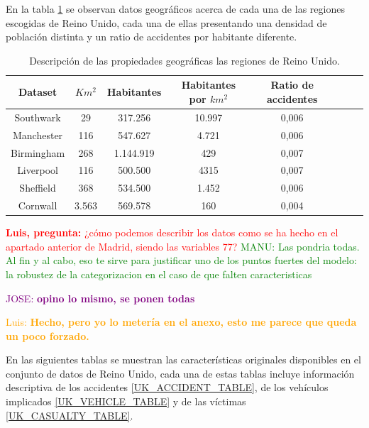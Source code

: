 \documentclass{uathesis-es}
\begin{document}
{%

En la tabla \ref{UK_statistics} se observan datos geográficos acerca de cada una de las regiones escogidas de Reino Unido, cada una de ellas presentando una densidad de población distinta y un ratio de accidentes por habitante diferente.

\begin{table}[H]
	\begin{center}
		\begin{tabular}{|c|c||c|c|c|c|c|c|}
		\hline
        \textbf{Dataset} & \textbf{$Km^2$} & \textbf{Habitantes} & \textbf{Habitantes por $km^2$} & \textbf{Ratio de accidentes}
		\\ \hline \hline
        Southwark   &  29   &   317.256  & 10.997  & 0,006 \\ \hline
        Manchester  &  116  &   547.627  &  4.721  & 0,006 \\ \hline
        Birmingham  &  268  & 1.144.919  &    429  & 0,007 \\ \hline
        Liverpool   &  116  &   500.500  &   4315  & 0,007 \\ \hline
        Sheffield   &  368  &   534.500  &  1.452  & 0,006  \\ \hline
        Cornwall    & 3.563 &   569.578  &    160  & 0,004 \\ \hline
		\end{tabular}
	\end{center}
	\caption{Descripción de las propiedades geográficas las regiones de Reino Unido.}
	\label{UK_statistics}
\end{table}


\textcolor{red}{\textbf{Luis, pregunta:} ¿cómo podemos describir los datos como se ha hecho en el apartado anterior de Madrid, siendo las variables 77?}
\textcolor{green}{MANU: Las pondria todas. Al fin y al cabo, eso te sirve para justificar uno de los puntos fuertes del modelo: la robustez de la categorizacion en el caso de que falten caracteristicas}

\textcolor{purple}{JOSE: \textbf{opino lo mismo, se ponen todas}}

\textcolor{orange}{Luis: \textbf{Hecho, pero yo lo metería en el anexo, esto me parece que queda un poco forzado.}}


En las siguientes tablas se muestran las características originales disponibles en el conjunto de datos de Reino Unido, cada una de estas tablas incluye información descriptiva de los accidentes \ref{UK_ACCIDENT_TABLE}, de los vehículos implicados \ref{UK_VEHICLE_TABLE} y de las víctimas \ref{UK_CASUALTY_TABLE}.

}
\end{document}
